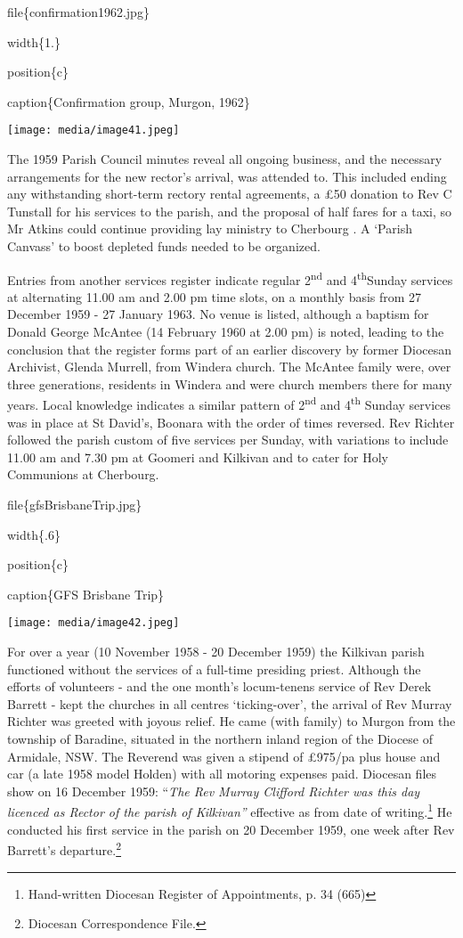 file\{confirmation1962.jpg\}

width\{1.\}

position\{c\}

caption\{Confirmation group, Murgon, 1962\}

\texttt{[image: media/image41.jpeg]}

The 1959 Parish Council minutes reveal all ongoing business, and the necessary arrangements for the new rector's arrival, was attended to. This included ending any withstanding short-term rectory rental agreements, a £50 donation to Rev C Tunstall for his services to the parish, and the proposal of half fares for a taxi, so Mr Atkins could continue providing lay ministry to Cherbourg . A `Parish Canvass' to boost depleted funds needed to be organized.

Entries from another services register indicate regular 2\textsuperscript{nd} and 4\textsuperscript{th}Sunday services at alternating 11.00 am and 2.00 pm time slots, on a monthly basis from 27 December 1959 - 27 January 1963. No venue is listed, although a baptism for Donald George McAntee (14 February 1960 at 2.00 pm) is noted, leading to the conclusion that the register forms part of an earlier discovery by former Diocesan Archivist, Glenda Murrell, from Windera church. The McAntee family were, over three generations, residents in Windera and were church members there for many years. Local knowledge indicates a similar pattern of 2\textsuperscript{nd} and 4\textsuperscript{th} Sunday services was in place at St David's, Boonara with the order of times reversed. Rev Richter followed the parish custom of five services per Sunday, with variations to include 11.00 am and 7.30 pm at Goomeri and Kilkivan and to cater for Holy Communions at Cherbourg.

file\{gfsBrisbaneTrip.jpg\}

width\{.6\}

position\{c\}

caption\{GFS Brisbane Trip\}

\texttt{[image: media/image42.jpeg]}

For over a year (10 November 1958 - 20 December 1959) the Kilkivan parish functioned without the services of a full-time presiding priest. Although the efforts of volunteers - and the one month's locum-tenens service of Rev Derek Barrett - kept the churches in all centres `ticking-over', the arrival of Rev Murray Richter was greeted with joyous relief. He came (with family) to Murgon from the township of Baradine, situated in the northern inland region of the Diocese of Armidale, NSW. The Reverend was given a stipend of £975/pa plus house and car (a late 1958 model Holden) with all motoring expenses paid. Diocesan files show on 16 December 1959: ``\emph{The Rev Murray Clifford Richter was this day licenced as Rector of the parish of Kilkivan''} effective as from date of writing.\footnote{Hand-written Diocesan Register of Appointments, p. 34 (665)} He conducted his first service in the parish on 20 December 1959, one week after Rev Barrett's departure.\footnote{Diocesan Correspondence File.}

